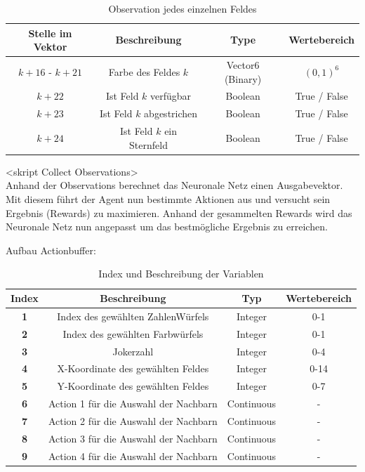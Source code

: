 \begin{table}[htbp]
    \centering
    \begin{tabular}{|c|c|c|c|}
    \hline
    \textbf{Stelle im Vektor} & \textbf{Beschreibung} & \textbf{Type} & \textbf{Wertebereich} \\
    \hline
    $k+16$ - $k+21$ & Farbe des Feldes $k$ & Vector6 (Binary) & $(0, 1)^6$ \\
    \hline
    $k+22$ & Ist Feld $k$ verfügbar & Boolean & True / False \\
    \hline
    $k+23$ & Ist Feld $k$ abgestrichen & Boolean & True / False \\
    \hline
    $k+24$ & Ist Feld $k$ ein Sternfeld & Boolean & True / False \\
    \hline
    \end{tabular}
    \caption{Observation jedes einzelnen Feldes}
    \label{tab:field_variables}
\end{table}

<skript Collect Observations> \\
Anhand der Observations berechnet das Neuronale Netz einen Ausgabevektor. Mit diesem führt der Agent nun bestimmte Aktionen aus und versucht sein Ergebnis (Rewards) zu maximieren.
Anhand der gesammelten Rewards wird das Neuronale Netz nun angepasst um das bestmögliche Ergebnis zu erreichen.


Aufbau Actionbuffer:
\begin{table}[htbp]
    \centering
    \caption{Index und Beschreibung der Variablen}
    \begin{tabular}{|c|c|c|c|}
    \hline
    \textbf{Index} & \textbf{Beschreibung} & \textbf{Typ} & \textbf{Wertebereich} \\
    \hline
    \textbf{1} & Index des gewählten ZahlenWürfels & Integer & 0-1 \\
    \hline
    \textbf{2} & Index des gewählten Farbwürfels & Integer & 0-1 \\
    \hline
    \textbf{3} & Jokerzahl & Integer & 0-4 \\
    \hline
    \textbf{4} & X-Koordinate des gewählten Feldes & Integer & 0-14 \\
    \hline
    \textbf{5} & Y-Koordinate des gewählten Feldes & Integer & 0-7 \\
    \hline
    \textbf{6} &  Action 1 für die Auswahl der Nachbarn & Continuous & - \\
    \hline
    \textbf{7} &  Action 2 für die Auswahl der Nachbarn & Continuous & - \\
    \hline
    \textbf{8} &  Action 3 für die Auswahl der Nachbarn & Continuous & - \\
    \hline
    \textbf{9} &  Action 4 für die Auswahl der Nachbarn & Continuous & - \\
    \hline
    \end{tabular}
    \label{tab:variables}
\end{table}

